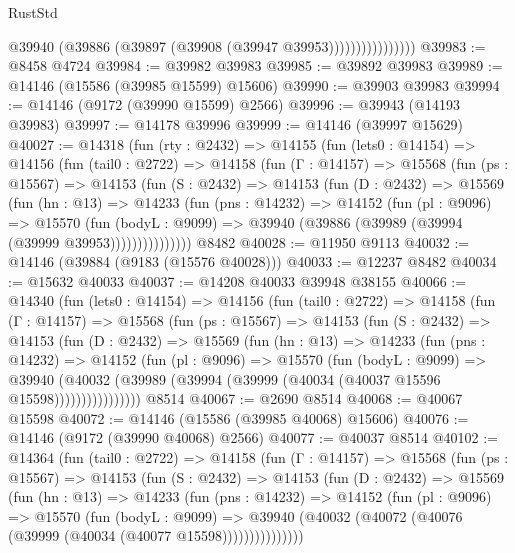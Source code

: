 \begin{lexlean}{RustStd}
\begin{coremodule}
                          @39940 (@39886 (@39897 (@39908 (@39947 @39953))))))))))))))))
@39983 := @8458 @4724
@39984 := @39982 @39983
@39985 := @39892 @39983
@39989 := @14146 (@15586 (@39985 @15599) @15606)
@39990 := @39903 @39983
@39994 := @14146 (@9172 (@39990 @15599) @2566)
@39996 := @39943 (@14193 @39983)
@39997 := @14178 @39996
@39999 := @14146 (@39997 @15629)
@40027 := @14318
    (fun (rty : @2432) =>
    @14155
      (fun (lets0 : @14154) =>
      @14156
        (fun (tail0 : @2722) =>
        @14158
          (fun (Γ : @14157) =>
          @15568
            (fun (ps : @15567) =>
            @14153
              (fun (S : @2432) =>
              @14153
                (fun (D : @2432) =>
                @15569
                  (fun (hn : @13) =>
                  @14233
                    (fun (pns : @14232) =>
                    @14152
                      (fun (pl : @9096) =>
                      @15570
                        (fun (bodyL : @9099) =>
                        @39940 (@39886 (@39989 (@39994 (@39999 @39953)))))))))))))))
    @8482
@40028 := @11950 @9113
@40032 := @14146 (@39884 (@9183 (@15576 @40028)))
@40033 := @12237 @8482
@40034 := @15632 @40033
@40037 := @14208 @40033 @39948 @38155
@40066 := @14340
    (fun (lets0 : @14154) =>
    @14156
      (fun (tail0 : @2722) =>
      @14158
        (fun (Γ : @14157) =>
        @15568
          (fun (ps : @15567) =>
          @14153
            (fun (S : @2432) =>
            @14153
              (fun (D : @2432) =>
              @15569
                (fun (hn : @13) =>
                @14233
                  (fun (pns : @14232) =>
                  @14152
                    (fun (pl : @9096) =>
                    @15570
                      (fun (bodyL : @9099) =>
                      @39940
                        (@40032
                          (@39989 (@39994 (@39999 (@40034 (@40037 @15596 @15598))))))))))))))))
    @8514
@40067 := @2690 @8514
@40068 := @40067 @15598
@40072 := @14146 (@15586 (@39985 @40068) @15606)
@40076 := @14146 (@9172 (@39990 @40068) @2566)
@40077 := @40037 @8514
@40102 := @14364
    (fun (tail0 : @2722) =>
    @14158
      (fun (Γ : @14157) =>
      @15568
        (fun (ps : @15567) =>
        @14153
          (fun (S : @2432) =>
          @14153
            (fun (D : @2432) =>
            @15569
              (fun (hn : @13) =>
              @14233
                (fun (pns : @14232) =>
                @14152
                  (fun (pl : @9096) =>
                  @15570
                    (fun (bodyL : @9099) =>
                    @39940 (@40032 (@40072 (@40076 (@39999 (@40034 (@40077 @15598)))))))))))))))

\end{coremodule}
\end{lexlean}
